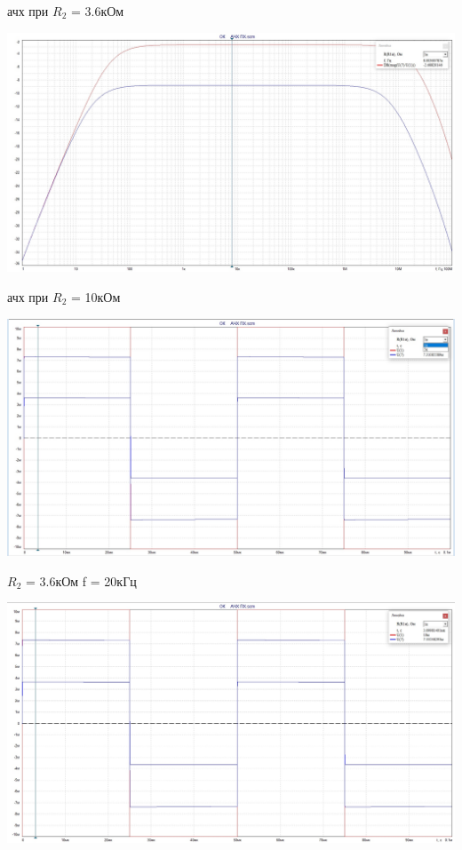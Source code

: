 \documentclass[a4paper,14pt]{extarticle}
\begin{document}
    ачх при $R_2$ = 3.6кОм

    \begin{center}
        \includegraphics[scale=0.3]{5.6.jpg}
    \end{center}

    ачх при $R_2$ = 10кОм

    \begin{center}
        \includegraphics[scale=0.3]{5.1.jpg}
    \end{center}

    $R_2$ = 3.6кОм f = 20кГц

    \begin{center}
        \includegraphics[scale=0.3]{5.2.jpg}
    \end{center}
\end{document}
